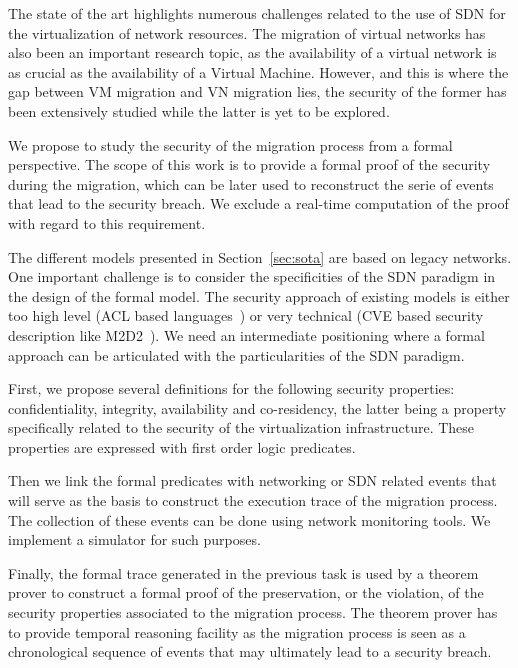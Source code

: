The state of the art highlights numerous challenges related to the use of SDN for the virtualization of network resources.
The migration of virtual networks has also been an important research topic, as the availability of a virtual network is as crucial as the availability of a Virtual Machine.
However, and this is where the gap between VM migration and VN migration lies, the security of the former has been extensively studied while the latter is yet to be explored.

We propose to study the security of the migration process from a formal perspective.
The scope of this work is to provide a formal proof of the security during the migration, which can be later used to reconstruct the serie of events that lead to the security breach. We exclude a real-time computation of the proof with regard to this requirement.

The different models presented in Section~\ref{sec:sota} are based on legacy networks.
One important challenge is to consider the specificities of the SDN paradigm in the design of the formal model.
The security approach of existing models is either too high level (ACL based languages~\cite{orbac,mulval-Ou2013}) or very technical (CVE based security description like M2D2~\cite{M2D2-Morin2002}).
We need an intermediate positioning where a formal approach can be articulated with the particularities of the SDN paradigm.

First, we propose several definitions for the following security properties: confidentiality, integrity, availability 
and co-residency, the latter being a property specifically related to the security of the virtualization infrastructure.
These properties are expressed with first order logic predicates.

Then we link the formal predicates with networking or SDN related events that will serve as the basis to construct the execution trace of the migration process.
The collection of these events can be done using network monitoring tools.
We implement a simulator for such purposes.

Finally, the formal trace generated in the previous task is used by a theorem prover to construct a formal proof of the preservation, or the violation, of the security properties associated to the migration process. The theorem prover has to provide temporal reasoning facility as the migration process is seen as a chronological sequence of events that may ultimately lead to a security breach.
